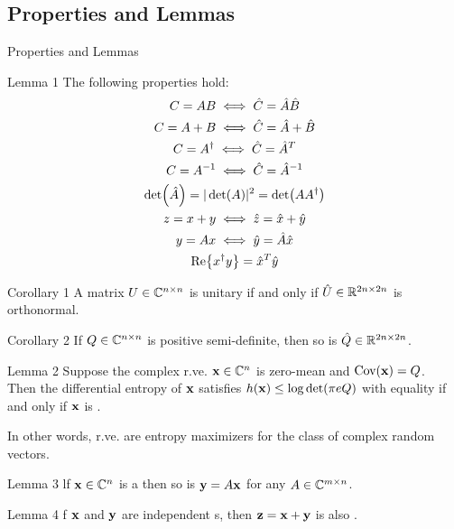 \subsection{Properties and Lemmas}
\begin{frame}[allowframebreaks]{Properties and Lemmas}
\begin{block}{Lemma 1}
	The following properties hold:
	\begin{subequations}
	\begin{gather}
	C=AB \iff \hat{C} = \hat{A}\hat{B}\\
	C = A+B \iff \hat{C} = \hat{A} + \hat{B}\\
	C = A^\dagger \iff \hat{C}=\hat{A}^T\\
	C=A^{-1} \iff \hat{C} = \hat{A}^{-1}\\
	\det(\hat{A}) = |\det(A)|^2 = \det(A A^\dagger)\\
	z = x+y \iff \hat{z} = \hat{x}+\hat{y}\\
	y=Ax \iff \hat{y} = \hat{A}\hat{x}\\
	\Re{\ensuremath{x^\dagger}y} = \hat{x}^T\hat{y}
	\end{gather}
	\end{subequations}
\end{block}

\framebreak

\begin{block}{Corollary 1}
A matrix $U\in \mathbb{C}^{n\times n}$ is unitary if and only if $\hat{U}\in \mathbb{R}^{2n\times 2n}$ is orthonormal.
\end{block}
\begin{block}{Corollary 2}
If $Q\in \mathbb{C}^{n\times n}$ is positive semi-definite, then so is $\hat{Q}\in \mathbb{R}^{2n\times 2n}$.
\end{block}
\begin{alertblock}{Lemma 2}\justify
Suppose the complex r.ve. $\vb{x}\in \mathbb{C}^{n}$ is
zero-mean and $\text{Cov}\qty(\vb{x})=Q$.\\
Then the differential entropy of $\vb{x}$ satisfies $h(\vb{x}) \leq \log\det(\pi e Q)$ with equality if and only if $\vb{x}$ is \cscg.
\end{alertblock}
In other words, \cscg{} r.ve. are entropy maximizers for the class of complex random vectors.

\framebreak

\begin{block}{Lemma 3}
lf $\vb{x}\in \mathbb{C}^{n}$ is a \cscg{} then so is $\vb{y} = A\vb{x}$ for any $A \in \mathbb{C}^{m\times n}$.
\end{block}
\begin{block}{Lemma 4}\label{lemma:4}
	f $\vb{x}$ and $\vb{y}$ are independent {\cscg s}, then $\vb{z}=\vb{x}+\vb{y}$ is also \cscg.
\end{block}

\end{frame}

